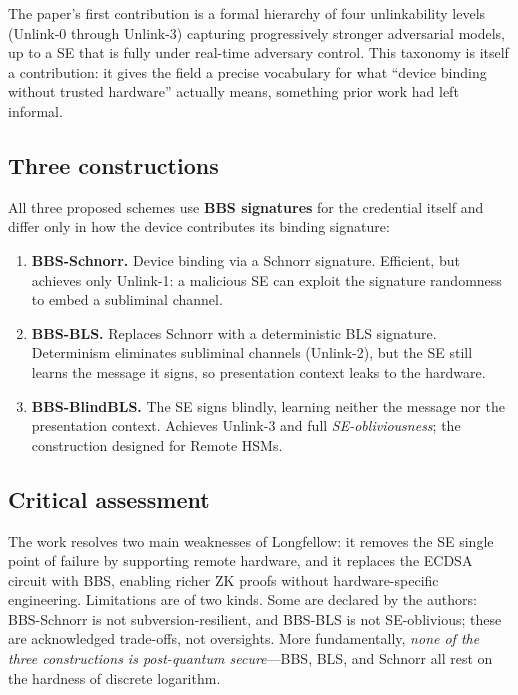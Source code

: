 \documentclass[11pt]{article}
\begin{document}
The paper's first contribution is a formal hierarchy of four unlinkability
levels (Unlink-0 through Unlink-3) capturing progressively stronger
adversarial models, up to a SE that is fully under real-time adversary
control. This taxonomy is itself a contribution: it gives the field a
precise vocabulary for what ``device binding without trusted hardware''
actually means, something prior work had left informal.

\subsection{Three constructions}

All three proposed schemes use \textbf{BBS signatures} for the credential
itself and differ only in how the device contributes its binding signature:
\begin{enumerate}
  \item \textbf{BBS-Schnorr.} Device binding via a Schnorr signature.
        Efficient, but achieves only Unlink-1: a malicious SE can exploit
        the signature randomness to embed a subliminal channel.
  \item \textbf{BBS-BLS.} Replaces Schnorr with a deterministic BLS
        signature. Determinism eliminates subliminal channels (Unlink-2),
        but the SE still learns the message it signs, so presentation
        context leaks to the hardware.
  \item \textbf{BBS-BlindBLS.} The SE signs blindly, learning neither the
        message nor the presentation context. Achieves Unlink-3 and full
        \emph{SE-obliviousness}; the construction designed for Remote HSMs.
\end{enumerate}

\subsection{Critical assessment}

The work resolves two main weaknesses of Longfellow: it removes the SE
single point of failure by supporting remote hardware, and it replaces the
ECDSA circuit with BBS, enabling richer ZK proofs without hardware-specific
engineering. Limitations are of two kinds. Some are declared by the authors:
BBS-Schnorr is not subversion-resilient, and BBS-BLS is not SE-oblivious;
these are acknowledged trade-offs, not oversights. More fundamentally,
\emph{none of the three constructions is post-quantum secure}---BBS, BLS, and
Schnorr all rest on the hardness of discrete logarithm.
\end{document}
